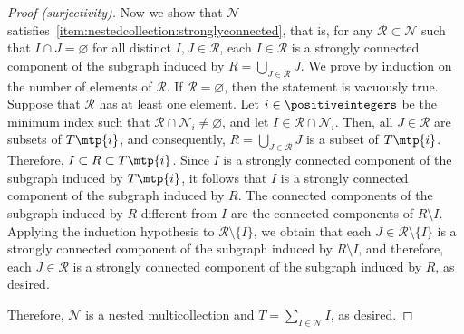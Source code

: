 \begin{proof}[Proof (surjectivity)]
    Now we show that \(\mathcal{N}\) satisfies~\ref{item:nestedcollection:stronglyconnected},
    that is, for any \(\mathcal{R} \subset \mathcal{N}\) such that \(I \cap J = \varnothing\) for all distinct \(I, J \in \mathcal{R}\),
    each \(I \in \mathcal{R}\) is a strongly connected component of the subgraph induced by \(R = \bigcup_{J \in \mathcal{R}} J\).
    We prove by induction on the number of elements of \(\mathcal{R}\).
    If \(\mathcal{R} = \varnothing\), then the statement is vacuously true.
    Suppose that \(\mathcal{R}\) has at least one element.
    Let \(i \in \positiveintegers\) be the minimum index such that \(\mathcal{R} \cap \mathcal{N}_i \neq \varnothing\), and let \(I \in \mathcal{R} \cap \mathcal{N}_i\).
    Then, all \(J \in \mathcal{R}\) are subsets of \(T\mtp{i}\), and consequently, \(R = \bigcup_{J \in \mathcal{R}} J\) is a subset of \(T\mtp{i}\).
    Therefore, \(I \subset R \subset T\mtp{i}\).
    Since \(I\) is a strongly connected component of the subgraph induced by \(T\mtp{i}\), it follows that \(I\) is a strongly connected component of the subgraph induced by \(R\).
    The connected components of the subgraph induced by \(R\) different from \(I\) are the connected components of \(R \setminus I\).
    Applying the induction hypothesis to \(\mathcal{R} \setminus \{I\}\), we obtain that each \(J \in \mathcal{R} \setminus \{I\}\) is a strongly connected component of the subgraph induced by \(R \setminus I\), and therefore, each \(J \in \mathcal{R}\) is a strongly connected component of the subgraph induced by \(R\), as desired.

    Therefore, \(\mathcal{N}\) is a nested multicollection and \(T = \sum_{I \in \mathcal{N}} I\), as desired.
\end{proof}

